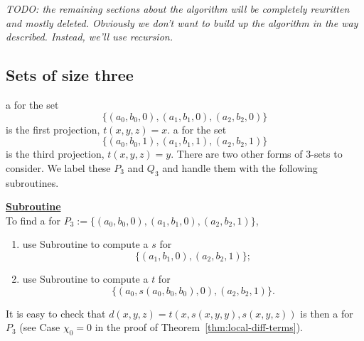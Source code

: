   
  
  
  \noindent \emph{TODO: the remaining sections about the algorithm will be completely
  rewritten and mostly deleted.  Obviously we don't want to build up the
  algorithm in the way described.  Instead, we'll use recursion.}
  
  \subsection{Sets of size three}
  a \ldto for the set
  \begin{equation*}
  \{(a_0,b_0, 0), (a_1, b_1, 0), (a_2, b_2, 0)\}
  \end{equation*}
  is the first projection, $t(x,y,z) = x$.
  a \ldto for the set
  \begin{equation*}
  \{(a_0,b_0,1), (a_1, b_1, 1), (a_2, b_2, 1)\}
  \end{equation*}
  is the third projection, $t(x,y,z) = y$.
  There are two other forms of 3-sets to consider.
  We label these $P_3$ and $Q_3$ and handle them with
  the following subroutines.
  
  
  \noindent \underline{\textbf{Subroutine }}\\[4pt]
  To find a \ldto for
  $P_3:=\{(a_0, b_0, 0), (a_1, b_1, 0),  (a_2, b_2, 1)\}$,
  \begin{enumerate}
  \item use Subroutine  to compute a \ldto $s$ for
  \begin{equation*}
  \{(a_1, b_1, 0), (a_2, b_2, 1)\};
  \end{equation*}
  \item use Subroutine  to compute a \ldto $t$ for
  \begin{equation*}
  \{(a_0, s(a_0, b_0, b_0), 0), (a_2, b_2, 1)\}.
  \end{equation*}
  \end{enumerate}
  It is easy to check that
  $d(x,y,z) = t(x, s(x,y,y), s(x,y,z))$
  is then a \ldto for $P_3$
  (see Case $\chi_0=0$ in the proof of Theorem~\ref{thm:local-diff-terms}).
  
